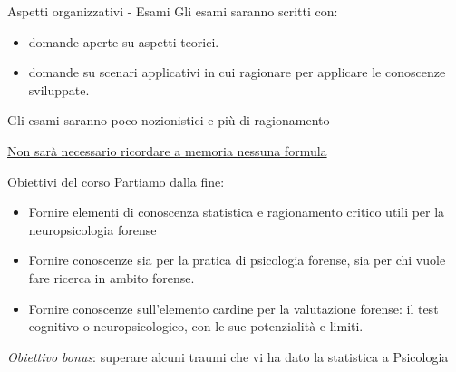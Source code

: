 \documentclass[
  ignorenonframetext,
]{beamer}
\providecommand{\tightlist}{%
  \setlength{\itemsep}{0pt}\setlength{\parskip}{0pt}}
\begin{document}
\begin{frame}{Aspetti organizzativi - Esami}
\label{aspetti-organizzativi---esami}
Gli esami saranno scritti con:

\begin{itemize}
\tightlist
\item
  domande aperte su aspetti teorici.
\item
  domande su scenari applicativi in cui ragionare per applicare le
  conoscenze sviluppate.
\end{itemize}

Gli esami saranno poco nozionistici e più di ragionamento

\underline{Non sarà necessario ricordare a memoria nessuna formula}
\end{frame}

\begin{frame}{Obiettivi del corso}
\label{obiettivi-del-corso}
Partiamo dalla fine:

\begin{itemize}
\tightlist
\item
  Fornire elementi di conoscenza statistica e ragionamento critico utili
  per la neuropsicologia forense
\item
  Fornire conoscenze sia per la pratica di psicologia forense, sia per
  chi vuole fare ricerca in ambito forense.
\item
  Fornire conoscenze sull'elemento cardine per la valutazione forense:
  il test cognitivo o neuropsicologico, con le sue potenzialità e
  limiti.
\end{itemize}

\emph{Obiettivo bonus}: superare alcuni traumi che vi ha dato la
statistica a Psicologia
\end{frame}
\end{document}
